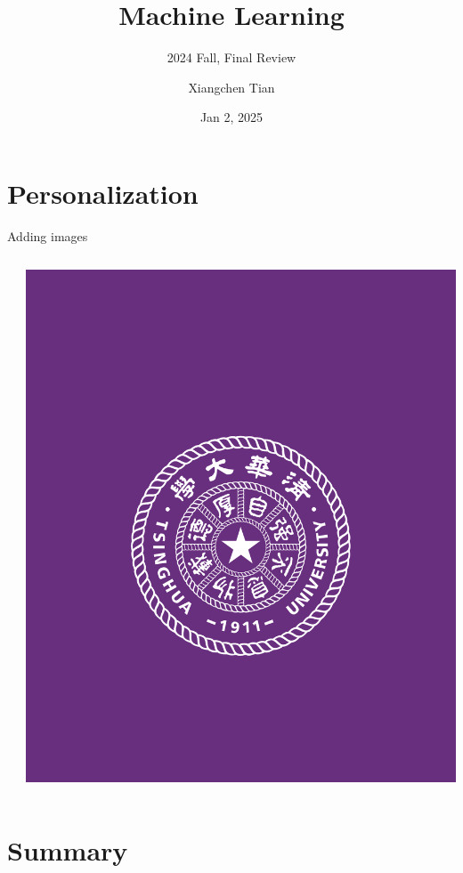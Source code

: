 \documentclass{beamer}
\title{Machine Learning}
\subtitle{2024 Fall, Final Review}
\author{Xiangchen Tian}
\date{Jan 2, 2025}
\begin{document}
\maketitle











% 





\begin{frame}[fragile]{}
\framesubtitle{}
\end{frame}

\section{Personalization}

\begin{frame}[fragile]{Adding images}
\begin{columns}
\begin{column}{0.7\textwidth}

\end{column}
\begin{column}{0.3\textwidth}
\includegraphics[width=\textwidth]
{assets/logo_RGB}
\end{column}
\end{columns}
\end{frame}

\section{Summary}


\backmatter
\end{document}
